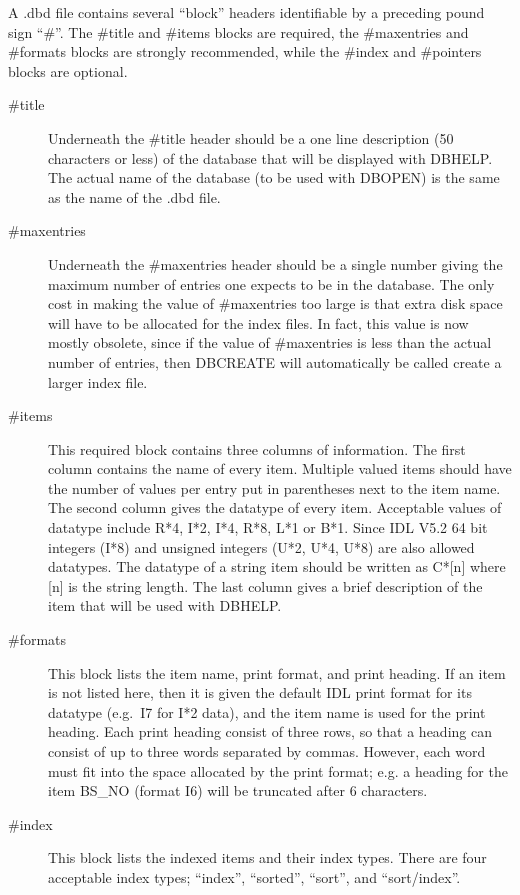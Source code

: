 A .dbd file contains several ``block'' headers identifiable by a 
preceding pound sign ``\#''.  The \#title and \#items blocks are
required, the \#maxentries and \#formats blocks are strongly recommended,
while the \#index and \#pointers blocks are optional.
\begin{description}
\item [\#title] Underneath the \#title header should be a one line description
(50 characters or less) of the database that will be displayed with
DBHELP.  The actual name of the database (to be used with DBOPEN) is the
same as the name of the .dbd file.   
\item [\#maxentries] Underneath the \#maxentries header should be a single
number giving the maximum number of entries one expects to be in the database.
The only cost in making the value of \#maxentries too large is that extra
disk space will have to be allocated for the index files.  In fact, this
value is now mostly obsolete, since if the value of
\#maxentries is less than the actual number of entries, then DBCREATE will
automatically be called create a larger index file.   
\item [\#items]  This required block contains three columns of information.
The first column contains the name of every item.  Multiple valued items
should have the number of values per entry put in parentheses next to the
item name.
The second column
gives the datatype of every item.  Acceptable values of datatype include
R*4, I*2, I*4, R*8, L*1 or B*1.   Since IDL V5.2 64 bit integers (I*8) and
unsigned integers (U*2, U*4, U*8) are also allowed datatypes. The datatype 
of a string item should be
written as C*[n] where [n] is the string length.  The last column
gives a brief description of the item that will be used with DBHELP.
\item [\#formats] This block lists the item name, print format, and print
heading.  If an item is not listed here, then it is given the default
IDL print format for its datatype (e.g.\ I7 for I*2 data), and the item
name is used for the print heading.  Each print heading consist of three
rows, so that a heading can consist of up to three words separated by
commas.   However, each word must fit into the space allocated by the
print format; e.g. a heading for the item BS\_NO (format I6) will be
truncated after 6 characters.
\item [\#index]  
This block lists the indexed items and their index types.    
There are four acceptable index types; ``index'', ``sorted'',
``sort'', and ``sort/index''.   

\end{description}
